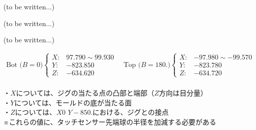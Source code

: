(to be written...)


(to be written...)





(to be written...)



\begin{tcolorbox}[title={2023/07/28時点の\MMname 実測値}, fonttitle=\gtfamily\bfseries]
\begin{align*}
  \text{Bot ($B=0$)}
  \left\{
  \begin{array}{rl}
    X: & 97.790 \sim 99.930\\
    Y: & -823.850\\
    Z: & -634.620
  \end{array}
  \right.\quad
  \text{Top ($B=180.$)}
  \left\{
  \begin{array}{rl}
    X: & -97.980 \sim -99.570\\
    Y: & -823.780\\
    Z: & -634.720
  \end{array}
  \right.
\end{align*}\\
・$X$については、ジグの当たる点の凸部と端部（$Z$方向は目分量）\\
・$Y$については、モールドの底が当たる面\\
・$Z$については、$X0$ $Y-850.$における、ジグとの接点\\
※これらの値に、タッチセンサー先端球の半径を加減する必要がある
\end{tcolorbox}






